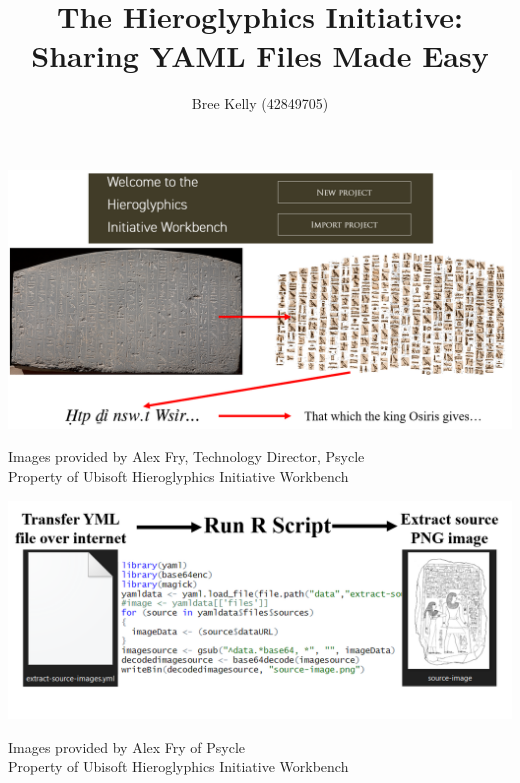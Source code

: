 \documentclass[unknownkeysallowed,usepdftitle=false, parskip=full, aspectratio=1610]{beamer}
\title{The Hieroglyphics Initiative: Sharing YAML Files Made Easy}
\author{Bree Kelly (42849705)}
\institute{Ancient History Department, Macquarie University, Sydney}
\newcommand{\secvariable}{nothing}
\newcommand{\mysection}[1]{\renewcommand{\secvariable}{#1}
}
\begin{document}
\mysection{abstract}
\begin{frame}\label{\secvariable}


\begin{center}
\vspace{-0.5cm}
\includegraphics[width=1\textwidth,height=0.75\textheight,keepaspectratio]{figure/PICO_33.PNG}
\end{center}
\vfill
\parbox{\linewidth}{\tiny Images provided by Alex Fry, Technology Director, Psycle
\\Property of Ubisoft Hieroglyphics Initiative Workbench}

\end{frame}

\begin{frame}\label{\secvariable}

\begin{center}
\vfill
\includegraphics[width=1\textwidth,keepaspectratio]{figure/PICO_34.PNG}
\end{center}
\vfill
\parbox{\linewidth}{\tiny Images provided by Alex Fry of Psycle
\\Property of Ubisoft Hieroglyphics Initiative Workbench}

\end{frame}
\end{document}
